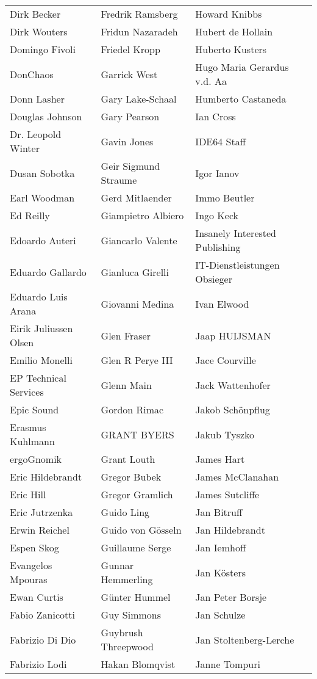 \begin{small}
\begin{tabular}{p{4cm}p{4cm}p{4cm}}
Dirk Becker & Fredrik Ramsberg & Howard Knibbs \\
Dirk Wouters & Fridun Nazaradeh & Hubert de Hollain \\
Domingo Fivoli & Friedel Kropp & Huberto Kusters \\
DonChaos & Garrick West & Hugo Maria Gerardus v.d. Aa \\
Donn Lasher & Gary Lake-Schaal & Humberto Castaneda \\
Douglas Johnson & Gary Pearson & Ian Cross \\
Dr. Leopold Winter & Gavin Jones & IDE64 Staff \\
Dusan Sobotka & Geir Sigmund Straume & Igor Ianov \\
Earl Woodman & Gerd Mitlaender & Immo Beutler \\
Ed Reilly & Giampietro Albiero & Ingo Keck \\
Edoardo Auteri & Giancarlo Valente & Insanely Interested Publishing \\
Eduardo Gallardo & Gianluca Girelli & IT-Dienstleistungen Obsieger \\
Eduardo Luis Arana & Giovanni Medina & Ivan Elwood \\
Eirik Juliussen Olsen & Glen Fraser & Jaap HUIJSMAN \\
Emilio Monelli & Glen R Perye III & Jace Courville \\
EP Technical Services & Glenn Main & Jack Wattenhofer \\
Epic Sound & Gordon Rimac & Jakob Schönpflug \\
Erasmus Kuhlmann & GRANT BYERS & Jakub Tyszko \\
ergoGnomik & Grant Louth & James Hart \\
Eric Hildebrandt & Gregor Bubek & James McClanahan \\
Eric Hill & Gregor Gramlich & James Sutcliffe \\
Eric Jutrzenka & Guido Ling & Jan Bitruff \\
Erwin Reichel & Guido von Gösseln & Jan Hildebrandt \\
Espen Skog & Guillaume Serge & Jan Iemhoff \\
Evangelos Mpouras & Gunnar Hemmerling & Jan Kösters \\
Ewan Curtis & Günter Hummel & Jan Peter Borsje \\
Fabio Zanicotti & Guy Simmons & Jan Schulze \\
Fabrizio Di Dio & Guybrush Threepwood & Jan Stoltenberg-Lerche \\
Fabrizio Lodi & Hakan Blomqvist & Janne Tompuri \\

\end{tabular}
\end{small}
